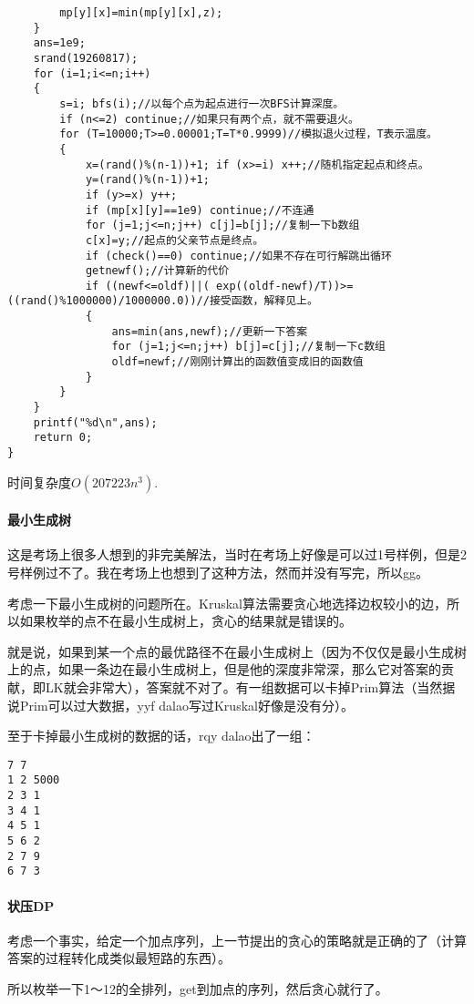 \begin{verbatim}
        mp[y][x]=min(mp[y][x],z);
    }
    ans=1e9;
    srand(19260817);
    for (i=1;i<=n;i++)
    {
        s=i; bfs(i);//以每个点为起点进行一次BFS计算深度。
        if (n<=2) continue;//如果只有两个点，就不需要退火。
        for (T=10000;T>=0.00001;T=T*0.9999)//模拟退火过程，T表示温度。
        {
            x=(rand()%(n-1))+1; if (x>=i) x++;//随机指定起点和终点。
            y=(rand()%(n-1))+1;
            if (y>=x) y++;
            if (mp[x][y]==1e9) continue;//不连通
            for (j=1;j<=n;j++) c[j]=b[j];//复制一下b数组
            c[x]=y;//起点的父亲节点是终点。
            if (check()==0) continue;//如果不存在可行解跳出循环
            getnewf();//计算新的代价
            if ((newf<=oldf)||( exp((oldf-newf)/T))>=((rand()%1000000)/1000000.0))//接受函数，解释见上。
            {
                ans=min(ans,newf);//更新一下答案
                for (j=1;j<=n;j++) b[j]=c[j];//复制一下c数组
                oldf=newf;//刚刚计算出的函数值变成旧的函数值
            }
        }
    }
    printf("%d\n",ans);
    return 0;
}
\end{verbatim}

	时间复杂度$O(207223n^3)$.
	\paragraph{最小生成树}
	这是考场上很多人想到的非完美解法，当时在考场上好像是可以过1号样例，但是2号样例过不了。我在考场上也想到了这种方法，然而并没有写完，所以gg。

	考虑一下最小生成树的问题所在。Kruskal算法需要贪心地选择边权较小的边，所以如果枚举的点不在最小生成树上，贪心的结果就是错误的。

	就是说，如果到某一个点的最优路径不在最小生成树上（因为不仅仅是最小生成树上的点，如果一条边在最小生成树上，但是他的深度非常深，那么它对答案的贡献，即L\times K就会非常大），答案就不对了。有一组数据可以卡掉Prim算法（当然据说Prim可以过大数据，yyf dalao写过Kruskal好像是没有分）。

	至于卡掉最小生成树的数据的话，rqy dalao出了一组：
	\begin{verbatim}
7 7
1 2 5000
2 3 1
3 4 1
4 5 1
5 6 2
2 7 9
6 7 3 
\end{verbatim}
	\paragraph{状压DP}
	考虑一个事实，给定一个加点序列，上一节提出的贪心的策略就是正确的了（计算答案的过程转化成类似最短路的东西）。

	所以枚举一下1～12的全排列，get到加点的序列，然后贪心就行了。

